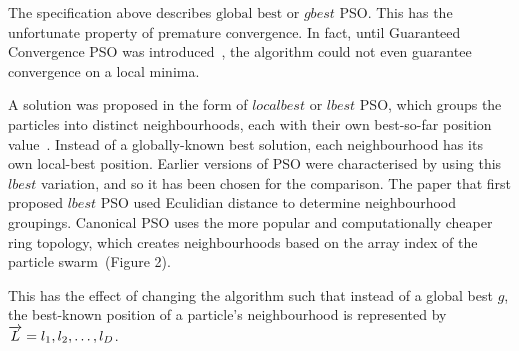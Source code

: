 \documentclass{csfourzero}
\newcommand{\rarrow}[1]{\overrightarrow{#1\vphantom{b}}}
\begin{document}
The specification above describes $\text{global best}$ or $gbest$ PSO\@. This
has the unfortunate property of premature convergence. In fact, until Guaranteed
Convergence PSO was introduced~\cite{vandenBergh:2002tk}, the algorithm could
not even guarantee convergence on a local minima.

A solution was proposed in the form of $local best$ or $lbest$ PSO, which groups
the particles into distinct neighbourhoods, each with their own best-so-far
position value~\cite{Suganthan:1999iv}. Instead of a globally-known best
solution, each neighbourhood has its own local-best position. Earlier versions
of PSO were characterised by using this $lbest$ variation, and so it has been
chosen for the comparison. The paper that first proposed $lbest$ PSO used
Eculidian distance to determine neighbourhood groupings.  Canonical PSO uses the
more popular and computationally cheaper ring topology, which creates
neighbourhoods based on the array index of the particle swarm~(Figure 2).

This has the effect of changing the algorithm such that instead
of a global best $g$, the best-known position of a particle's neighbourhood is
represented by $\rarrow{L} = l_1, l_2,\ldots,l_D$.
\end{document}
